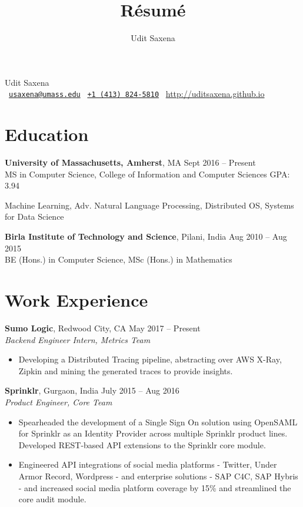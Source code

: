 \documentclass[letterpaper]{article}
\title{R\'esum\'e}
\author{Udit Saxena}
\begin{document}
\pagecolor{white}
\begin{center}
\huge
Udit Saxena\\
\small
\faEnvelope~\href{mailto:usaxena@umass.edu}{\nolinkurl{usaxena@umass.edu}}
\faPhone~\href{tel:14138245810}{\texttt{+1 (413) 824-5810}}
\faGlobe~\url{http://uditsaxena.github.io}
\normalsize
\end{center}

\section*{Education}
\vspace{-1mm}
\textbf{University of Massachusetts, Amherst}, MA \hfill Sept 2016 --
    Present\\
MS in Computer Science, College of Information and Computer Sciences \hfill GPA: 3.94
\vspace{-2mm}
\begin{description}[leftmargin=!, labelwidth=\widthof{Coursework },
        font=\normalfont]
    \item[Coursework:] Machine Learning, Adv. Natural Language Processing, Distributed OS,
                        Systems for Data Science
\end{description}
\vspace{-0.5mm}
\textbf{Birla Institute of Technology and Science}, Pilani, India \hfill
    Aug 2010 -- Aug 2015\\
BE (Hons.) in Computer Science,
MSc (Hons.) in Mathematics
\vspace{-1mm}
\section*{Work Experience}
\textbf{Sumo Logic}, Redwood City, CA \hfill May 2017 -- Present\\
\emph{Backend Engineer Intern, Metrics Team}\\
\vspace{-6mm}
\begin{itemize}
\item Developing a Distributed Tracing pipeline, abstracting over AWS X-Ray, Zipkin and mining the generated traces to provide insights.
\end{itemize}
\vspace{-1mm}
\textbf{Sprinklr}, Gurgaon, India \hfill July 2015 -- Aug 2016\\
\emph{Product Engineer, Core Team}\\
\vspace{-6mm}
\begin{itemize}
\item Spearheaded the development of a Single Sign On solution using OpenSAML for Sprinklr as an Identity Provider  across multiple Sprinklr product lines. Developed REST-based API extensions to the Sprinklr core module.
\vspace{-2mm}
\item Engineered API integrations of social media platforms - Twitter, Under Armor Record, Wordpress - and enterprise solutions - SAP C4C, SAP Hybris - and increased social media platform coverage by 15\% and streamlined the core audit module.
\end{itemize}
\end{document}
